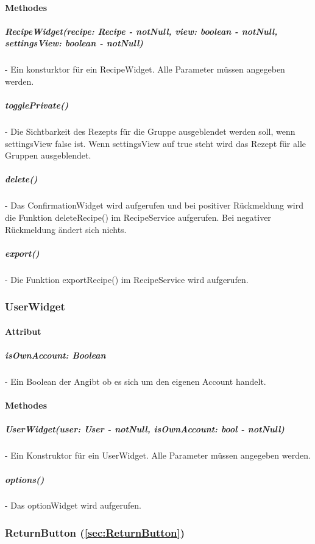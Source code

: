 \documentclass[parskip=full]{scrartcl}
\begin{document}
        \paragraph*{Methodes}
            \subparagraph*{RecipeWidget(recipe: Recipe - notNull, view: boolean - notNull, settingsView: boolean - notNull)} - Ein konsturktor für ein RecipeWidget. Alle Parameter müssen angegeben werden.
            \subparagraph*{togglePrivate()} - Die Sichtbarkeit des Rezepts für die Gruppe ausgeblendet werden soll, wenn settingsView false ist. Wenn settingsView auf true steht wird das Rezept für alle Gruppen ausgeblendet.
            \subparagraph*{delete()} - Das ConfirmationWidget wird aufgerufen und bei positiver Rückmeldung wird die Funktion deleteRecipe() im RecipeService aufgerufen. Bei negativer Rückmeldung ändert sich nichts.
            \subparagraph*{export()} - Die Funktion exportRecipe() im RecipeService wird aufgerufen.

    \subsubsection{UserWidget}
        \paragraph*{Attribut}
            \subparagraph*{isOwnAccount: Boolean} - Ein Boolean der Angibt ob es sich um den eigenen Account handelt.

        \paragraph*{Methodes}
            \subparagraph*{UserWidget(user: User - notNull, isOwnAccount: bool - notNull)} - Ein Konstruktor für ein UserWidget. Alle Parameter müssen angegeben werden.
            \subparagraph*{options()} - Das optionWidget wird aufgerufen.

    \subsubsection{ReturnButton (\autoref{sec:ReturnButton})}
\end{document}

